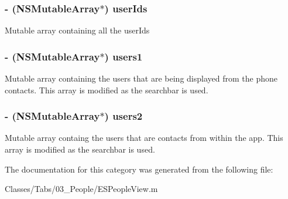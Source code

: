 \subsubsection[{user\+Ids}]{\setlength{\rightskip}{0pt plus 5cm}-\/ (N\+S\+Mutable\+Array$\ast$) user\+Ids\hspace{0.3cm}{\ttfamily [protected]}}\label{category_e_s_people_view_07_08_a612fdb0ea8b8e860f7ff21ba8352388c}
Mutable array containing all the user\+Ids \hypertarget{category_e_s_people_view_07_08_a44aa509432456def45707ab3b992c158}{}
\subsubsection[{users1}]{\setlength{\rightskip}{0pt plus 5cm}-\/ (N\+S\+Mutable\+Array$\ast$) users1\hspace{0.3cm}{\ttfamily [protected]}}\label{category_e_s_people_view_07_08_a44aa509432456def45707ab3b992c158}
Mutable array containing the users that are being displayed from the phone contacts. This array is modified as the searchbar is used. \hypertarget{category_e_s_people_view_07_08_aa0a7c1aa200b51fa9c8e9190fcaa258f}{}
\subsubsection[{users2}]{\setlength{\rightskip}{0pt plus 5cm}-\/ (N\+S\+Mutable\+Array$\ast$) users2\hspace{0.3cm}{\ttfamily [protected]}}\label{category_e_s_people_view_07_08_aa0a7c1aa200b51fa9c8e9190fcaa258f}
Mutable array containg the users that are contacts from within the app. This array is modified as the searchbar is used. 

The documentation for this category was generated from the following file\+:\begin{DoxyCompactItemize}
\item 
Classes/\+Tabs/03\+\_\+\+People/E\+S\+People\+View.\+m\end{DoxyCompactItemize}
